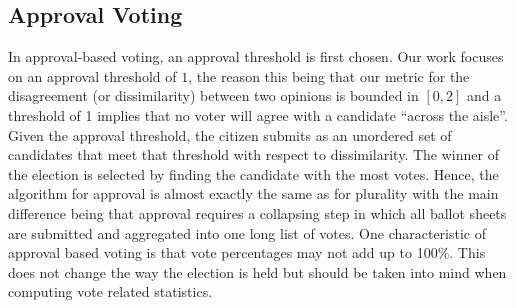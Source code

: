 \subsection{Approval Voting}
In approval-based voting, an approval threshold is first chosen. Our work focuses on an approval threshold of $1$, the reason
this being that our metric for the disagreement (or dissimilarity) between two opinions is bounded in $[0,2]$ and a threshold of 1 implies that
no voter will agree with a candidate ``across the aisle''. Given the approval threshold, the citizen submits as an unordered set of candidates
that meet that threshold with respect to dissimilarity.
The winner of the election is selected by finding the candidate with the most votes. 
Hence, the algorithm for approval is almost exactly the same as for plurality with the main difference being that approval
requires a collapsing step in which all ballot sheets are submitted and aggregated into one long list of votes.
One characteristic of approval based voting is that vote percentages may not add up to 100\%. 
This does not change the way the election is held but should be taken into mind when computing vote related statistics. 

